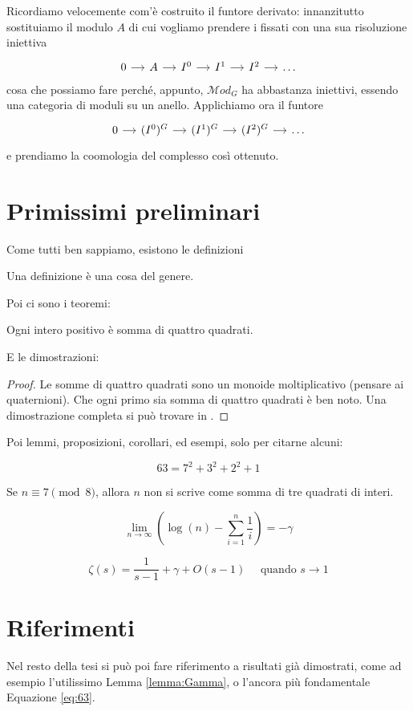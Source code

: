 Ricordiamo velocemente com'è costruito il funtore derivato: innanzitutto sostituiamo il modulo $ A $ di cui vogliamo prendere i fissati con una sua risoluzione iniettiva
\[\begin{tikzcd}[column sep = small]
0 \rar & A \rar & I^0 \rar & I^1 \rar & I^2 \rar & \dots
\end{tikzcd}\]
cosa che possiamo fare perché, appunto, $ \mathcal{M}od_G $ ha abbastanza iniettivi, essendo una categoria di moduli su un anello. Applichiamo ora il funtore
\[\begin{tikzcd}[column sep = small]
0 \rar & (I^0)^G \rar & (I^1)^G \rar & (I^2)^G \rar & \dots
\end{tikzcd}\]
e prendiamo la coomologia del complesso così ottenuto.

\section{Primissimi preliminari}

Come tutti ben sappiamo, esistono le definizioni
\begin{definition}
Una definizione è una cosa del genere.
\end{definition}

Poi ci sono i teoremi:
\begin{theorem}
Ogni intero positivo è somma di quattro quadrati.
\end{theorem}

E le dimostrazioni:
\begin{proof}
Le somme di quattro quadrati sono un monoide moltiplicativo (pensare ai quaternioni). Che ogni primo sia somma di quattro quadrati è ben noto. Una dimostrazione completa si può trovare in \cite[Teorema 2.3]{ArticoloFondamentale}.
\end{proof}

Poi lemmi, proposizioni, corollari, ed esempi, solo per citarne alcuni:

\begin{example}
\begin{equation}\label{eq:63}
63=7^2+3^2+2^2+1
\end{equation}
\end{example}
\begin{proposition}
Se $n \equiv 7 \pmod 8$, allora $n$ non si scrive come somma di tre quadrati di interi.
\end{proposition}
\begin{lemma}\label{lemma:Gamma}
\[
\lim_{n \to \infty} \left( \log(n) - \sum_{i=1}^n \frac{1}{i} \right)= -\gamma
\]
\end{lemma}
\begin{corollary}
\[
\zeta(s) = \frac{1}{s-1} + \gamma + O(s-1) \quad \text{ quando } s \to 1
\]
\end{corollary}

\section{Riferimenti}
Nel resto della tesi si può poi fare riferimento a risultati già dimostrati, come ad esempio l'utilissimo Lemma \ref{lemma:Gamma}, o l'ancora più fondamentale Equazione \eqref{eq:63}.